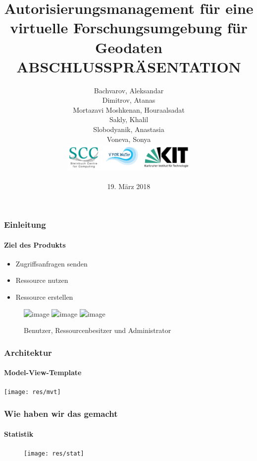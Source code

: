 \documentclass{beamer}
\title[Autorisierungsmanagement für eine virtuelle
Forschungsumgebung für Geodaten: Abschlusspräsentation]{Autorisierungsmanagement für eine virtuelle
Forschungsumgebung für Geodaten \\ \textbf{ABSCHLUSSPRÄSENTATION}} %
\author[]{
Bachvarov, Aleksandar\\
Dimitrov, Atanas\\
Mortazavi Moshkenan, Houraalsadat\\
Sakly, Khalil\\
Slobodyanik, Anastasia\\
Voneva, Sonya\\ \vspace{.75cm}
	\includegraphics[width=6.5cm, height=1.5cm]{res/logos} 
}
\date{19. März 2018} %
\begin{document}
\begin{frame}[plain]
\titlepage %
\end{frame}




\begin{frame}
\frametitle{Einleitung}
\framesubtitle{Ziel des Produkts}

\begin{itemize}
	\item<1-7> Zugriffsanfragen senden
	\item<2-7> Ressource nutzen
	\item<3-7> Ressource erstellen
\end{itemize}
	\begin{figure}
		
			\includegraphics<4-7>[height=2cm,width=2cm]{res/benutzer}
			\hspace{0.2cm}
			\includegraphics<5-7>[height=2cm,width=2cm]{res/ressbesitzer}
			\hspace{0.2cm}
			\includegraphics<6-7>[height=2cm,width=2cm]{res/admin}	
			\item<7>Benutzer, Ressourcenbesitzer und Administrator
			
	\end{figure}

\end{frame}
\begin{frame}

\frametitle{Architektur}
\framesubtitle{Model-View-Template}
\vspace{1cm}
\texttt{[image: res/mvt]}

\end{frame}
\begin{frame}

\frametitle{Wie haben wir das gemacht}
\framesubtitle{Statistik}
\begin{figure}
\vspace{1cm}
\texttt{[image: res/stat]}
\end{figure}

\end{frame}
\end{document}
